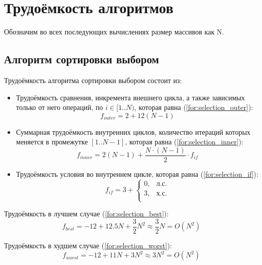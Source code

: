\section{Трудоёмкость алгоритмов}

Обозначим во всех последующих вычислениях размер массивов как N.

\subsection{Алгоритм сортировки выбором}

Трудоёмкость алгоритма сортировки выбором состоит из:
\begin{itemize}
    \item Трудоёмкость сравнения, инкремента внешнего цикла, а также зависимых только от него операций, по $i \in [1..N)$, которая равна (\ref{for:selection_outer}):
        \begin{equation}
            \label{for:selection_outer}
            f_{outer} = 2 + 12(N - 1)
        \end{equation}
    \item Суммарная трудоёмкость внутренних циклов, количество итераций которых меняется в промежутке $[1..N-1]$, которая равна (\ref{for:selection_inner}):
        \begin{equation}
            \label{for:selection_inner}
            f_{inner} = 2(N - 1) + \frac{N \cdot (N - 1)}{2} \cdot f_{if}
        \end{equation}
    \item Трудоёмкость условия во внутреннем цикле, которая равна (\ref{for:selection_if}):
        \begin{equation}
            \label{for:selection_if}
            f_{if} = 3 + \begin{cases}
                0, & \text{л.с.}\\
                3, & \text{х.с.}\\
            \end{cases}
        \end{equation}
\end{itemize}

Трудоёмкость в лучшем случае (\ref{for:selection_best}):
\begin{equation}
    \label{for:selection_best}
    f_{best} = -12 + 12.5N + \frac{3}{2}N^2 \approx \frac{3}{2}N = O(N^2)
\end{equation}

Трудоёмкость в худшем случае (\ref{for:selection_worst}):
\begin{equation}
    \label{for:selection_worst}
    f_{worst} = -12 + 11N + 3N^2 \approx 3N^2 = O(N^2)
\end{equation}



